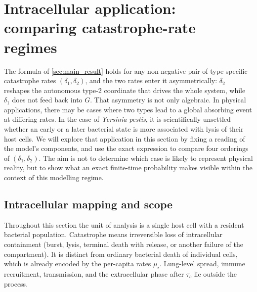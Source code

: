 \section{Intracellular application: comparing catastrophe-rate regimes}
\label{sec:biology}

The formula of \cref{sec:main_result} holds for any non-negative pair of type specific catastrophe rates $(\delta_1,\delta_2)$, and the two rates enter it asymmetrically: $\delta_2$ reshapes the autonomous type-2 coordinate that drives the whole system, while $\delta_1$ does not feed back into $G$. That asymmetry is not only algebraic. In physical applications, there may be cases where two types lead to a global absorbing event at differing rates. In the case of \textit{Yersinia pestis}, it is scientifically unsettled whether an early or a later bacterial state is more associated with lysis of their host cells. We will explore that application in this section by fixing a reading of the model's components, and use the exact expression to compare four orderings of $(\delta_1,\delta_2)$. The aim is not to determine which case is likely to represent physical reality, but to show what an exact finite-time probability makes visible within the context of this modelling regime.

\subsection{Intracellular mapping and scope}

Throughout this section the unit of analysis is a single host cell with a resident bacterial population. Catastrophe means irreversible loss of intracellular containment (burst, lysis, terminal death with release, or another failure of the compartment). It is distinct from ordinary bacterial death of individual cells, which is already encoded by the per-capita rates $\mu_i$. Lung-level spread, immune recruitment, transmission, and the extracellular phase after $\tau_c$ lie outside the process.

